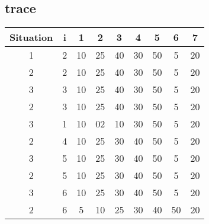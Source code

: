 \documentclass{article}
\begin{document}
		\subsection{trace}	
			\begin{tabular}{|c|c|c|c|c|c|c|c|c|}
				\hline
					\textbf{Situation} & \textbf{i} & \textbf{1} & \textbf{2} & \textbf{3}
						 & \textbf{4} & \textbf{5} & \textbf{6} & \textbf{7}\\
				\hline 
					1 & 2 & 10 & 25 & 40 & 30 & 50 & 5& 20\\
				\hline
					2 & 2& 10 & 25 & 40 & 30 & 50 & 5 & 20\\
				\hline
					3 & 3& 10 & 25& 40& 30& 50& 5& 20\\
				\hline
					2 & 3& 10 & 25& 40& 30& 50 &5& 20\\
				\hline
					3  & 1 & 10 & 02 &10 & 30 & 50 & 5 & 20\\
				\hline
					2 & 4 & 10 & 25 & 30 & 40 & 50 & 5 & 20\\
				\hline
					3 & 5& 10 & 25 & 30 & 40 & 50 & 5 & 20\\ 
				\hline
					2& 5& 10 & 25 & 30 & 40 & 50 & 5 & 20\\
				\hline
					3 & 6 & 10 & 25 & 30 & 40 & 50 & 5 & 20\\
				\hline
					2& 6 & 5 & 10 & 25 & 30 & 40 & 50&  20\\
				\hline
			\end{tabular}						
				
\end{document}

